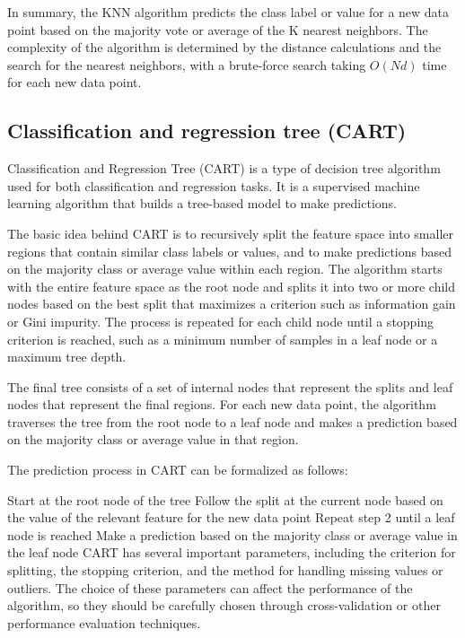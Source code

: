 \documentclass[12pt, a4paper, oneside]{article}
\begin{document}
In summary, the KNN algorithm predicts the class label or value for a new data point based on the majority vote or average of the K nearest neighbors. The complexity of the algorithm is determined by the distance calculations and the search for the nearest neighbors, with a brute-force search taking $O(Nd)$ time for each new data point.




\subsection{ Classification and regression tree (CART) }
Classification and Regression Tree (CART) is a type of decision tree algorithm used for both classification and regression tasks. It is a supervised machine learning algorithm that builds a tree-based model to make predictions.

The basic idea behind CART is to recursively split the feature space into smaller regions that contain similar class labels or values, and to make predictions based on the majority class or average value within each region. The algorithm starts with the entire feature space as the root node and splits it into two or more child nodes based on the best split that maximizes a criterion such as information gain or Gini impurity. The process is repeated for each child node until a stopping criterion is reached, such as a minimum number of samples in a leaf node or a maximum tree depth.

The final tree consists of a set of internal nodes that represent the splits and leaf nodes that represent the final regions. For each new data point, the algorithm traverses the tree from the root node to a leaf node and makes a prediction based on the majority class or average value in that region.

The prediction process in CART can be formalized as follows:

Start at the root node of the tree
Follow the split at the current node based on the value of the relevant feature for the new data point
Repeat step 2 until a leaf node is reached
Make a prediction based on the majority class or average value in the leaf node
CART has several important parameters, including the criterion for splitting, the stopping criterion, and the method for handling missing values or outliers. The choice of these parameters can affect the performance of the algorithm, so they should be carefully chosen through cross-validation or other performance evaluation techniques.
\end{document}
